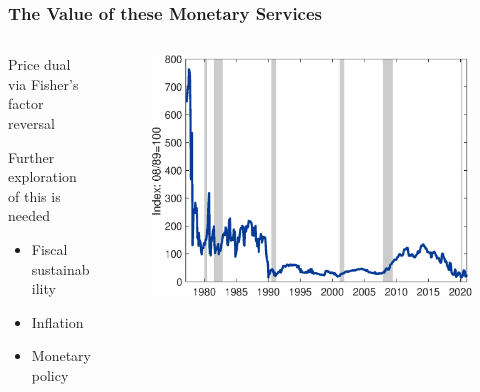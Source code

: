 \documentclass[11pt, handout, aspectratio=169]{beamer}
\newenvironment{wideitemize}{\itemize\addtolength{\itemsep}{10pt}}{\enditemize}
\begin{document}
\begin{frame}
\frametitle{The Value of these Monetary Services}
\begin{columns}
	\begin{column}{.45\textwidth}
		\begin{wideitemize}
			\item Price dual via Fisher's factor reversal
			\item Further exploration of this is needed
			\begin{itemize}
				\item Fiscal sustainability
				\item Inflation
				\item Monetary policy
			\end{itemize}
		\end{wideitemize}
	\end{column}
	\begin{column}{.55\textwidth}
		\begin{figure}[p]
			\centering
			\includegraphics[width=\textwidth]{../Figures/FiscalCapacity_Index.eps}
		\end{figure}
	\end{column}
\end{columns}
\end{frame}
\end{document}

